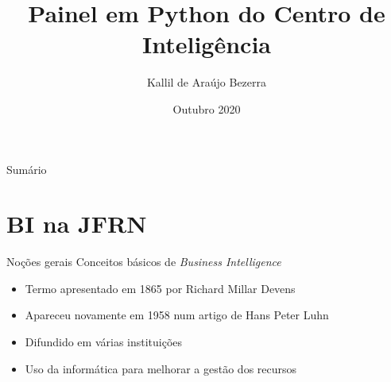 \documentclass[10pt,t]{beamer}
\title[Heverlee \LaTeX\ Beamer theme]{Painel em Python do Centro de Inteligência}
\author{Kallil de Araújo Bezerra}
\institute{Universidade Federal do Rio Grande do Norte}
\date{Outubro 2020}
\begin{document}

{


\begin{frame}
    \titlepage
\end{frame}
}		


\begin{frame}{Sumário}
	\vskip 2mm
	\hfill	{\large \parbox{.95\textwidth}{\tableofcontents[hideothersubsections]}}
\end{frame}



\section{BI na JFRN}

\begin{frame}{Noções gerais}\label{colorpalette}
\vspace{8pt}
Conceitos básicos de \textit{Business Intelligence}
    \begin{itemize}
        \item Termo apresentado em 1865 por Richard Millar Devens
        \item Apareceu novamente em 1958 num artigo de Hans Peter Luhn
    	\item Difundido em várias instituições
    	\item Uso da informática para melhorar a gestão dos recursos
    \end{itemize}
\end{frame} 
\end{document}
